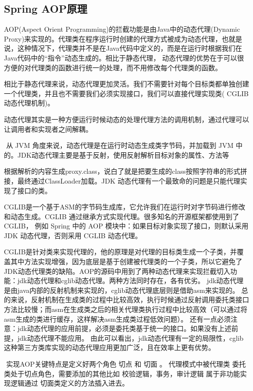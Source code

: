 \documentclass[../../../interview-questions.tex]{subfiles}
\begin{document}
\subsection{Spring AOP原理}

AOP(Aspect Orient Programming)的拦截功能是由Java中的动态代理(Dynamic Proxy)来实现的。代理类在程序运行时创建的代理方式被成为动态代理，也就是说，这种情况下，代理类并不是在Java代码中定义的，而是在运行时根据我们在Java代码中的“指令”动态生成的。相比于静态代理， 动态代理的优势在于可以很方便的对代理类的函数进行统一的处理，而不用修改每个代理类的函数。

​ 相比于静态代理来说，动态代理更加灵活。我们不需要针对每个目标类都单独创建一个代理类，并且也不需要我们必须实现接口，我们可以直接代理实现类( CGLIB 动态代理机制)。

​ 动态代理其实是一种方便运行时候动态的处理代理方法的调用机制，通过代理可以让调用者和实现者之间解耦。

​ 从 JVM 角度来说，动态代理是在运行时动态生成类字节码，并加载到 JVM 中的。JDK动态代理主要是基于反射，使用反射解析目标对象的属性、方法等

根据解析的内容生成proxy.class，说白了就是把要生成的class按照字符串的形式拼接，最终通过ClassLoader加载。JDK 动态代理有一个最致命的问题是只能代理实现了接口的类。

​ CGLIB是一个基于ASM的字节码生成库，它允许我们在运行时对字节码进行修改和动态生成。CGLIB 通过继承方式实现代理。很多知名的开源框架都使用到了CGLIB， 例如 Spring 中的 AOP 模块中：如果目标对象实现了接口，则默认采用 JDK 动态代理，否则采用 CGLIB 动态代理。

​ CGLIB是针对类来实现代理的，他的原理是对代理的目标类生成一个子类，并覆盖其中方法实现增强，因为底层是基于创建被代理类的一个子类，所以它避免了JDK动态代理类的缺陷。AOP的源码中用到了两种动态代理来实现拦截切入功能：jdk动态代理和cglib动态代理。两种方法同时存在，各有优劣。 jdk动态代理是由java内部的反射机制来实现的，cglib动态代理底层则是借助asm来实现的。 总的来说，反射机制在生成类的过程中比较高效，执行时候通过反射调用委托类接口方法比较慢；而asm在生成类之后的相关代理类执行过程中比较高效（可以通过将asm生成的类进行缓存，这样解决asm生成类过程低效问题）。 还有一点必须注意：jdk动态代理的应用前提，必须是委托类基于统一的接口。如果没有上述前提，jdk动态代理不能应用。 由此可以看出，jdk动态代理有一定的局限性，cglib这种第三方类库实现的动态代理应用更加广泛，且在效率上更有优势。

​ 实现AOP关键特点是定义好两个角色 切点 和 切面 。 代理模式中被代理类 委托类处于切点角色，需要添加的其他比如 校验逻辑，事务，审计逻辑 属于非功能实现逻辑通过 切面类定义的方法插入进去。
\end{document}
